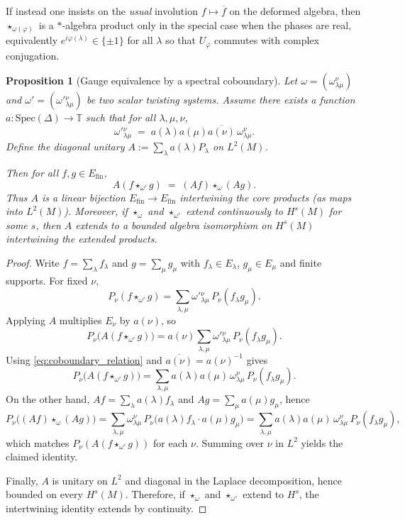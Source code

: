 \documentclass[11pt]{amsart}
\theoremstyle{plain}
\newtheorem{proposition}[theorem]{Proposition}
\theoremstyle{definition}
\theoremstyle{remark}
\newcommand{\Spec}{\mathrm{Spec}}
\newcommand{\bbT}{\mathbb{T}}
\begin{document}
If instead one insists on the \emph{usual} involution $f\mapsto\overline f$ on the deformed algebra,
then $\star_{\omega(\varphi)}$ is a $*$-algebra product only in the special case when the phases are real,
equivalently $e^{i\varphi(\lambda)}\in\{\pm1\}$ for all $\lambda$ so that $U_\varphi$ commutes with complex conjugation.

\begin{proposition}[Gauge equivalence by a spectral coboundary]\label{prop:gauge_equivalence}
Let $\omega=(\omega^\nu_{\lambda\mu})$ and $\omega'=(\omega'{}^\nu_{\lambda\mu})$ be two scalar twisting systems.
Assume there exists a function $a:\Spec(\Delta)\to\bbT$ such that for all $\lambda,\mu,\nu$,
\begin{equation}\label{eq:coboundary_relation}
\omega'{}^\nu_{\lambda\mu} \;=\; a(\lambda)a(\mu)\overline{a(\nu)}\,\omega^\nu_{\lambda\mu}.
\end{equation}
Define the diagonal unitary $A:=\sum_\lambda a(\lambda)P_\lambda$ on $L^2(M)$.

Then for all $f,g\in E_{\mathrm{fin}}$,
\[
A(f\star_{\omega'} g) \;=\; (Af)\star_\omega (Ag).
\]
Thus $A$ is a linear bijection $E_{\mathrm{fin}}\to E_{\mathrm{fin}}$ intertwining the core products (as maps into $L^2(M)$).
Moreover, if $\star_\omega$ and $\star_{\omega'}$ extend continuously to $H^s(M)$ for some $s$,
then $A$ extends to a bounded algebra isomorphism on $H^s(M)$ intertwining the extended products.
\end{proposition}

\begin{proof}
Write $f=\sum_\lambda f_\lambda$ and $g=\sum_\mu g_\mu$ with $f_\lambda\in E_\lambda$, $g_\mu\in E_\mu$ and finite supports.
For fixed $\nu$,
\[
P_\nu(f\star_{\omega'} g)=\sum_{\lambda,\mu} \omega'{}^\nu_{\lambda\mu}\,P_\nu(f_\lambda g_\mu).
\]
Applying $A$ multiplies $E_\nu$ by $a(\nu)$, so
\[
P_\nu\big(A(f\star_{\omega'} g)\big)
=
a(\nu)\sum_{\lambda,\mu} \omega'{}^\nu_{\lambda\mu}\,P_\nu(f_\lambda g_\mu).
\]
Using \eqref{eq:coboundary_relation} and $\overline{a(\nu)}=a(\nu)^{-1}$ gives
\[
P_\nu\big(A(f\star_{\omega'} g)\big)
=
\sum_{\lambda,\mu} a(\lambda)a(\mu)\,\omega^\nu_{\lambda\mu}\,P_\nu(f_\lambda g_\mu).
\]
On the other hand, $Af=\sum_\lambda a(\lambda)f_\lambda$ and $Ag=\sum_\mu a(\mu)g_\mu$, hence
\[
P_\nu\big((Af)\star_\omega (Ag)\big)
=
\sum_{\lambda,\mu} \omega^\nu_{\lambda\mu}\,P_\nu\big(a(\lambda)f_\lambda\cdot a(\mu)g_\mu\big)
=
\sum_{\lambda,\mu} a(\lambda)a(\mu)\,\omega^\nu_{\lambda\mu}\,P_\nu(f_\lambda g_\mu),
\]
which matches $P_\nu(A(f\star_{\omega'} g))$ for each $\nu$. Summing over $\nu$ in $L^2$ yields the claimed identity.

Finally, $A$ is unitary on $L^2$ and diagonal in the Laplace decomposition, hence bounded on every $H^s(M)$.
Therefore, if $\star_\omega$ and $\star_{\omega'}$ extend to $H^s$, the intertwining identity extends by continuity.
\end{proof}
\end{document}

